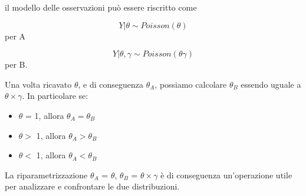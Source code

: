 il modello delle osservazioni può essere riscritto come

$$Y|\theta \sim Poisson(\theta)$$ per A

$$Y|\theta, \gamma \sim Poisson(\theta\gamma)$$ per B.

Una volta ricavato $\theta$, e di conseguenza $\theta_A$, possiamo calcolare $\theta_B$ essendo uguale a $\theta \times \gamma$.
In particolare se:
\begin{itemize}[-]
\item $\theta$ = 1, allora $\theta_A = \theta_B$
\item $\theta >$ 1, allora $\theta_A > \theta_B$
\item $\theta <$ 1, allora $\theta_A < \theta_B$
\end{itemize}

La riparametrizzazione $\theta_A$ = $\theta$, $\theta_B$ = $\theta \times \gamma$ è di 
conseguenza un'operazione utile per analizzare e confrontare le due distribuzioni.


